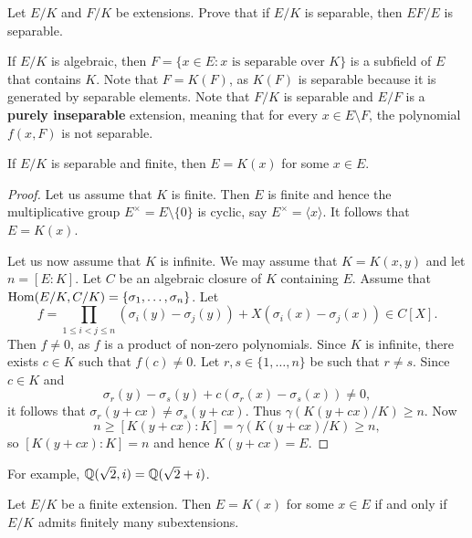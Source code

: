 \begin{exercise}
\label{xca:separable2}
    Let $E/K$ and $F/K$ be extensions. Prove that if $E/K$ is separable, 
    then $EF/E$ is separable. 
\end{exercise}


If $E/K$ is algebraic, then $F=\{x\in E:x\text{ is separable over }K\}$ 
is a subfield of $E$ that contains $K$. Note that $F=K(F)$, as
$K(F)$ is separable because it is generated by separable elements. Note that
$F/K$ is separable and 
$E/F$ is a \textbf{purely inseparable} extension, meaning that
for every $x\in E\setminus F$, the polynomial $f(x,F)$ is not separable. 

\begin{proposition}
    If $E/K$ is separable and finite, then $E=K(x)$ for some $x\in E$. 
\end{proposition}

\begin{proof}
    Let us assume that $K$ is finite. Then $E$ is finite and hence 
    the multiplicative group $E^{\times}=E\setminus\{0\}$ 
    is cyclic, say $E^{\times}=\langle x\rangle$. It follows
    that $E=K(x)$. 
    
    Let us now assume that $K$ is infinite. We may assume that 
    $K=K(x,y)$ and let $n=[E:K]$. Let $C$ be an algebraic closure of $K$ containing $E$. 
    Assume that $\operatorname{Hom}(E/K,C/K)=\{\sigma_1,\dots,\sigma_n\}$. Let 
    \[
    f=\prod_{1\leq i<j\leq n}\left(\sigma_i(y)-\sigma_j(y)\right)
    +X\left(\sigma_i(x)-\sigma_j(x)\right)\in C[X].
    \]
    Then $f\ne 0$, as $f$ is a product of non-zero polynomials. Since $K$ is infinite, 
    there exists $c\in K$ such that $f(c)\ne 0$. Let $r,s\in\{1,\dots,n\}$ be such that
    $r\ne s$. Since $c\in K$ and 
    \[
        \sigma_r(y)-\sigma_s(y)+c(\sigma_r(x)-\sigma_s(x))\ne 0,
    \]
    it follows that $\sigma_r(y+cx)\ne\sigma_s(y+cx)$. Thus $\gamma(K(y+cx)/K)\geq n$. 
    Now 
    \[
    n\geq [K(y+cx):K]=\gamma(K(y+cx)/K)\geq n,
    \]
    so $[K(y+cx):K]=n$ and
    hence $K(y+cx)=E$. 
\end{proof}

For example, $\mathbb{Q}(\sqrt{2},i)=\mathbb{Q}(\sqrt{2}+i)$. 

\begin{proposition}
    Let $E/K$ be a finite extension. Then $E=K(x)$ for some $x\in E$ 
    if and only if $E/K$ admits finitely many subextensions. 
\end{proposition}

